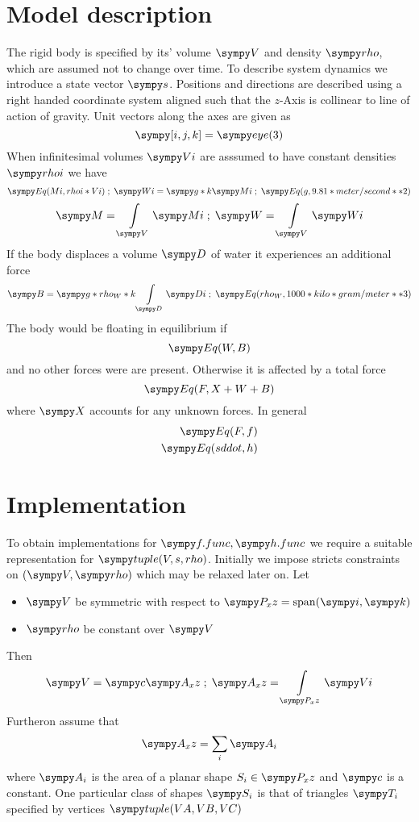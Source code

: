 \section{Model description}
The rigid body is specified by its' volume $\s{V}$ and density $\s{rho}$, which are assumed not to change over time.  To describe system dynamics we introduce a state vector $\s{s}$.  Positions and directions are described using a right handed coordinate system aligned such that the $z$-Axis is collinear to line of action of gravity.  Unit vectors along the axes are given as
$$\s{[i, j, k]} = \s{eye(3)}$$
When infinitesimal volumes $\s{Vi}$ are asssumed to have constant densities $\s{rhoi}$ we have 
$$\s{Eq(Mi, rhoi * Vi)} \;;\; \s{Wi} =  \s{g * k} \s{Mi} \;;\; \s{Eq(g, 9.81 * meter/second**2)}$$
$$\s{M} = \int\limits_{\s{V}} \s{Mi} \;;\; \s{W} = \int\limits_{\s{V}} \s{Wi}$$ 
If the body displaces a volume $\s{D}$ of water it experiences an additional force
$$\s{B} = \s{g * rho_W *  k}\int\limits_{\s{D}} \s{Di} \;;\; \s{Eq(rho_W, 1000 * kilo * gram/meter**3)}$$
The body would be floating in equilibrium if
$$\s{Eq(W, B)}$$ and no other forces were are present.  
Otherwise it is affected by a total force
$$\s{Eq(F, X + W + B)}$$
where $\s{X}$ accounts for any unknown forces.
In general
\begin{equation}
	\begin{split}
		\s{Eq(F, f)} \\
		\s{Eq(sddot, h)} \\
\end{split}
	\label{eq:eom}
\end{equation}

\section{Implementation}
To obtain implementations for $\s{f.func}, \s{h.func}$ we require a suitable representation for $\s{tuple(V, s, rho)}$.
Initially we impose stricts constraints on $(\s{V}, \s{rho})$ which may be relaxed later on.
Let 
\begin{itemize}
	\item $\s{V}$ be symmetric with respect to $\s{P_xz} = \operatorname{span}(\s{i}, \s{k})$
	\item $\s{rho}$ be constant over $\s{V}$
\end{itemize}
Then 
$$\s{V} = \s{c} \s{A_xz} \;;\; \s{A_xz} = \int\limits_{\s{P_xz}} \s{Vi}$$
Furtheron assume that 
$$\s{A_xz} = \sum\limits_i\s{A_i}$$
where $\s{A_i}$ is the area of a planar shape $S_i \in \s{P_xz}$ and $\s{c}$ is a constant.  
One particular class of shapes $\s{S_i}$ is that of triangles $\s{T_i}$ specified by vertices $\s{tuple(VA, VB, VC)}$


